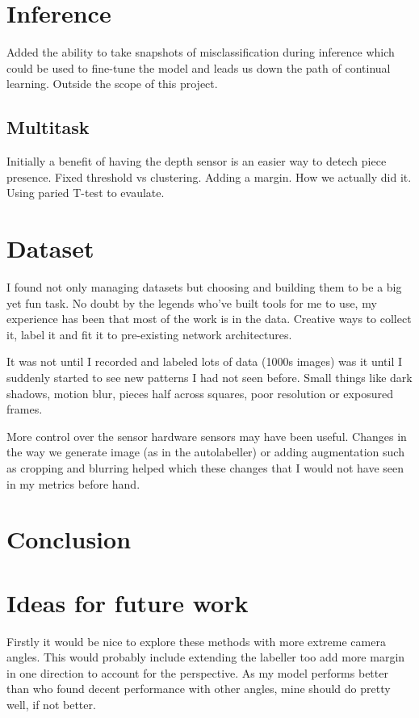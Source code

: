 \section{Inference}
Added the ability to take snapshots of misclassification during inference which could be used to fine-tune the model and leads us down the 
path of continual learning.  Outside the scope of this project.

\subsection{Multitask}
Initially a benefit of having the depth sensor is an easier way to detech piece presence.  
Fixed threshold vs clustering.  Adding a margin.  How we actually did it.
Using paried T-test to evaulate.

\section{Dataset}
I found not only managing datasets but choosing and building them to be a big yet fun task.  No doubt by the legends who've built tools for me to use,
my experience has been that most of the work is in the data. Creative ways to collect it, label it and fit it to pre-existing network architectures.  

It was not until I recorded and labeled lots of data (1000s images) was it until I suddenly started to see new patterns I had not seen before.  Small 
things like dark shadows, motion blur, pieces half across squares, poor resolution or exposured frames.

More control over the sensor hardware sensors may have been useful.  Changes in the way we generate image (as in the autolabeller) or
adding augmentation such as cropping and blurring helped which these changes that I would not have seen in my metrics before hand.

\section{Conclusion}



\section{Ideas for future work}
Firstly it would be nice to explore these methods with more extreme camera angles.  This would probably include extending the labeller too add more 
margin in one direction to account for the perspective. As my model performs better than \cite{} who found decent performance with other angles, mine should 
do pretty well, if not better.

